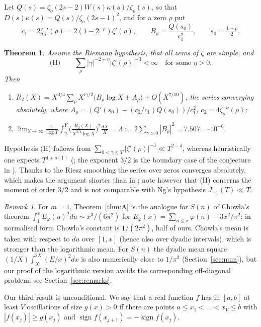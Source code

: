 \documentclass[11pt]{amsart}
\newtheorem{theorem}{Theorem}
\theoremstyle{remark}
\newtheorem{remark}{Remark}
\newcommand{\zo}{\zeta_{o}}
\begin{document}
Let $Q(s)=\zo(2s-2)W(s)\kappa(s)/\zo(s)$, so that $D(s)\kappa(s)=Q(s)/\zo(2s-1)^2$, and for a zero $\rho$ put
\[
c_1=2\zo'(\rho)=2(1-2^{-\rho})\zeta'(\rho),\qquad B_\rho=\frac{Q(s_0)}{c_1^2},\qquad s_0=\tfrac{1+\rho}{2}.
\]

\begin{theorem}\label{thm:B}
Assume the Riemann hypothesis, that all zeros of $\zeta$ are simple, and
\[
\text{(H)}\qquad \sum_\rho|\gamma|^{-2+\eta}|\zeta'(\rho)|^{-3}<\infty\quad\text{for some }\eta>0.
\]
Then
\begin{enumerate}
\item[(a)] $R_2(X)=X^{3/4}\sum_\rho X^{i\gamma/2}\big(B_\rho\log X+A_\rho\big)+O(X^{7/10})$, the series converging absolutely, where $A_\rho=(Q'(s_0)-(c_2/c_1)Q(s_0))/c_1^2$, $c_2=4\zo''(\rho)$;
\item[(b)] $\displaystyle\lim_{Y\to\infty}\frac1{\log Y}\int_2^Y\Big(\frac{R_2(X)}{X^{3/4}\log X}\Big)^2\frac{dX}{X}=\Lambda:=2\sum_{\gamma>0}|B_\rho|^2=7.507\ldots\cdot10^{-6}.$
\end{enumerate}
\end{theorem}

Hypothesis (H) follows from $\sum_{0<\gamma\le T}|\zeta'(\rho)|^{-3}\ll T^{2-\delta}$, whereas heuristically one expects $T^{1+o(1)}$ (\cite{Go,He}; the exponent $3/2$ is the boundary case of the conjecture in \cite{HKO}). Thanks to the Riesz smoothing the series over zeros converges absolutely, which makes the argument shorter than in \cite{Ng}; note however that (H) concerns the moment of order $3/2$ and is not comparable with Ng's hypothesis $J_{-1}(T)\ll T$.

\begin{remark}
For $m=1$, Theorem~\ref{thm:A} is the analogue for $S(n)$ of Chowla's theorem \cite{Ch} $\int_1^xE_\varphi(u)^2du\sim x^3/(6\pi^2)$ for $E_\varphi(x)=\sum_{n\le x}\varphi(n)-3x^2/\pi^2$; in normalised form Chowla's constant is $1/(2\pi^2)$, half of ours. Chowla's mean is taken with respect to $du$ over $[1,x]$ (hence also over dyadic intervals), which is stronger than the logarithmic mean. For $S(n)$ the dyadic mean square $(1/X)\int_X^{2X}(E/x)^2dx$ is also numerically close to $1/\pi^2$ (Section~\ref{sec:num}), but our proof of the logarithmic version avoids the corresponding off-diagonal problem; see Section~\ref{sec:remarks}.
\end{remark}

Our third result is unconditional. We say that a real function $f$ has in $[a,b]$ at least $V$ oscillations of size $g(x)>0$ if there are points $a\le x_1<\dots<x_V\le b$ with $|f(x_j)|\ge g(x_j)$ and $\operatorname{sign}f(x_{j+1})=-\operatorname{sign}f(x_j)$.
\end{document}
